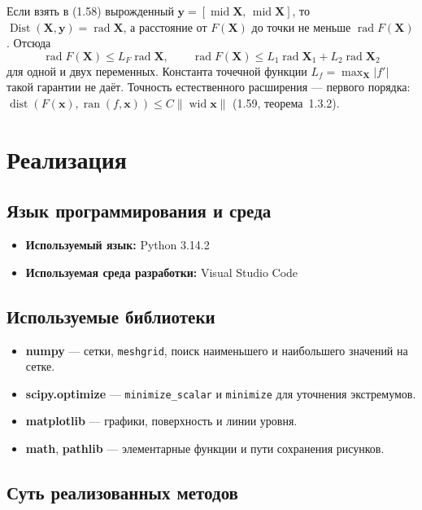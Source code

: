 \documentclass[a4paper, 14pt]{extarticle}
\begin{document}
Если взять в (1.58) вырожденный $\mathbf{y} = [\operatorname{mid}\mathbf{X},\,\operatorname{mid}\mathbf{X}]$, то $\operatorname{Dist}(\mathbf{X}, \mathbf{y}) = \operatorname{rad}\mathbf{X}$, а расстояние от $F(\mathbf{X})$ до точки не меньше $\operatorname{rad}F(\mathbf{X})$. Отсюда
\begin{equation*}
    \operatorname{rad}F(\mathbf{X}) \le L_F\operatorname{rad}\mathbf{X}, \qquad
    \operatorname{rad}F(\mathbf{X}) \le L_1\operatorname{rad}\mathbf{X}_1 + L_2\operatorname{rad}\mathbf{X}_2
\end{equation*}
для одной и двух переменных. Константа точечной функции $L_f = \max_{\mathbf{X}}|f'|$ такой гарантии не даёт. Точность естественного расширения --- первого порядка: $\operatorname{dist}(F(\mathbf{x}), \operatorname{ran}(f, \mathbf{x})) \le C\|\operatorname{wid}\mathbf{x}\|$ (1.59, теорема~1.3.2).

\section{Реализация}

\subsection{Язык программирования и среда}
\begin{itemize}
    \item \textbf{Используемый язык:} Python 3.14.2
    \item \textbf{Используемая среда разработки:} Visual Studio Code
\end{itemize}

\subsection{Используемые библиотеки}
\begin{itemize}
    \item \textbf{numpy} --- сетки, \texttt{meshgrid}, поиск наименьшего и наибольшего значений на сетке.
    \item \textbf{scipy.optimize} --- \texttt{minimize\_scalar} и \texttt{minimize} для уточнения экстремумов.
    \item \textbf{matplotlib} --- графики, поверхность и линии уровня.
    \item \textbf{math}, \textbf{pathlib} --- элементарные функции и пути сохранения рисунков.
\end{itemize}

\subsection{Суть реализованных методов}
\end{document}

